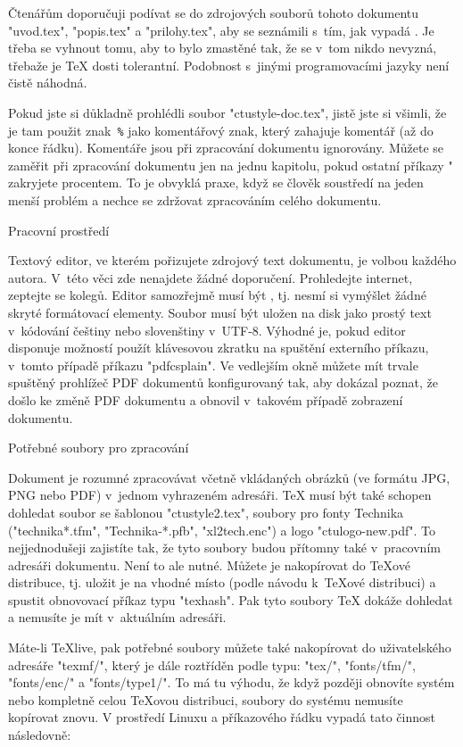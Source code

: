 Čtenářům doporučuji podívat se do zdrojových souborů tohoto dokumentu
"uvod.tex", "popis.tex" a "prilohy.tex", aby se seznámili s~tím, jak vypadá
. Je třeba se vyhnout tomu, aby to bylo
zmastěné tak, že se v~tom nikdo nevyzná, třebaže je \TeX{} dosti tolerantní.
Podobnost s~jinými programovacími jazyky není čistě náhodná.

Pokud jste si důkladně prohlédli soubor "ctustyle-doc.tex", jistě jste si všimli, že
je tam použit znak~{\tt\%} jako komentářový znak, který zahajuje komentář
(až do konce řádku). Komentáře jsou při zpracování dokumentu ignorovány. 
Můžete se zaměřit při zpracování dokumentu jen na jednu kapitolu, pokud ostatní
příkazy " zakryjete procentem. To je obvyklá praxe, když se
člověk soustředí na jeden menší problém a nechce se zdržovat zpracováním
celého dokumentu.


\sec Pracovní prostředí

Textový editor, ve kterém pořizujete zdrojový text dokumentu, je volbou
každého autora. V~této věci zde nenajdete žádné doporučení. Prohledejte
internet, zeptejte se kolegů. Editor samozřejmě musí být , tj. nesmí si vymýšlet žádné skryté formátovací elementy. Soubor
musí být uložen na disk jako prostý text v~kódování češtiny nebo slovenštiny 
v~UTF-8. Výhodné je, pokud editor disponuje možností použít klávesovou zkratku
na spuštění externího příkazu, v~tomto případě příkazu 
"pdfcsplain". Ve vedlejším okně můžete mít trvale spuštěný prohlížeč PDF
dokumentů konfigurovaný tak, aby dokázal poznat, že došlo ke
změně PDF dokumentu a obnovil v~takovém případě zobrazení dokumentu.

\sec Potřebné soubory pro zpracování

Dokument je rozumné zpracovávat včetně vkládaných obrázků (ve formátu JPG,
PNG nebo PDF) v~jednom vyhrazeném adresáři. \TeX{} musí být také schopen
dohledat soubor se šablonou "ctustyle2.tex", soubory pro fonty Technika 
("technika*.tfm", "Technika-*.pfb", "xl2tech.enc") a logo
"ctulogo-new.pdf". To nejjednodušeji zajistíte tak, že tyto soubory budou
přítomny také v~pracovním adresáři dokumentu. 
Není to ale nutné. Můžete je nakopírovat do \TeX{}ové distribuce, tj. uložit
je na vhodné místo (podle návodu k~\TeX{}ové distribuci) a spustit
obnovovací příkaz typu "texhash". Pak tyto soubory \TeX{} dokáže dohledat a
nemusíte je mít v~aktuálním adresáři.

Máte-li \TeX{}live, pak potřebné soubory můžete také nakopírovat do
uživatelského adresáře "texmf/", který je dále roztříděn podle typu: 
"tex/", "fonts/tfm/", "fonts/enc/" a "fonts/type1/". 
To má tu výhodu, že když později obnovíte systém nebo
kompletně celou \TeX{}ovou distribuci, soubory do
systému nemusíte kopírovat znovu. V prostředí Linuxu a příkazového řádku
vypadá tato činnost následovně:

